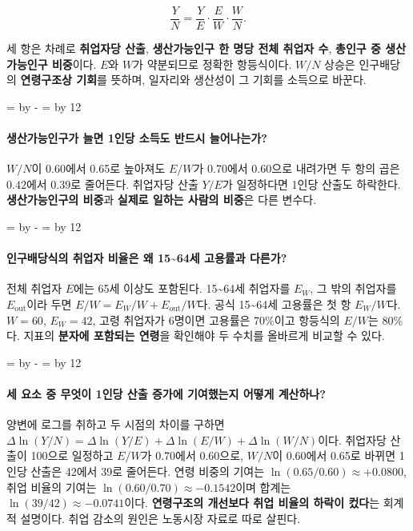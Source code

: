 \documentclass[10pt,a4paper]{article}
\newcommand{\ReserveQuestionSpace}{%
  \par\begingroup
  \dimen0=\pagegoal \advance\dimen0 by -\pagetotal
  \dimen2=\baselineskip \multiply\dimen2 by 12
  \ifdim\dimen0<\dimen2 \newpage\fi
  \endgroup}
\begin{document}
\[
\frac{Y}{N}=\frac{Y}{E}\cdot\frac{E}{W}\cdot\frac{W}{N}.
\]

세 항은 차례로 \textbf{취업자당 산출}, \textbf{생산가능인구 한 명당 전체 취업자 수}, \textbf{총인구 중 생산가능인구 비중}이다. $E$와 $W$가 약분되므로 정확한 항등식이다. $W/N$ 상승은 인구배당의 \textbf{연령구조상 기회}를 뜻하며, 일자리와 생산성이 그 기회를 소득으로 바꾼다.\par

\ReserveQuestionSpace
\paragraph{생산가능인구가 늘면 1인당 소득도 반드시 늘어나는가?}
$W/N$이 0.60에서 0.65로 높아져도 $E/W$가 0.70에서 0.60으로 내려가면 두 항의 곱은 $0.42$에서 $0.39$로 줄어든다. 취업자당 산출 $Y/E$가 일정하다면 1인당 산출도 하락한다. \textbf{생산가능인구의 비중}과 \textbf{실제로 일하는 사람의 비중}은 다른 변수다.\par

\ReserveQuestionSpace
\paragraph{인구배당식의 취업자 비율은 왜 15\textasciitilde{}64세 고용률과 다른가?}
전체 취업자 $E$에는 65세 이상도 포함된다. 15\textasciitilde{}64세 취업자를 $E_W$, 그 밖의 취업자를 $E_{\mathrm{out}}$이라 두면 $E/W=E_W/W+E_{\mathrm{out}}/W$다. 공식 15\textasciitilde{}64세 고용률은 첫 항 $E_W/W$다. $W=60$, $E_W=42$, 고령 취업자가 6명이면 고용률은 70\%이고 항등식의 $E/W$는 80\%다. 지표의 \textbf{분자에 포함되는 연령}을 확인해야 두 수치를 올바르게 비교할 수 있다.\par

\ReserveQuestionSpace
\paragraph{세 요소 중 무엇이 1인당 산출 증가에 기여했는지 어떻게 계산하나?}
양변에 로그를 취하고 두 시점의 차이를 구하면 $\Delta\ln(Y/N)=\Delta\ln(Y/E)+\Delta\ln(E/W)+\Delta\ln(W/N)$이다. 취업자당 산출이 100으로 일정하고 $E/W$가 0.70에서 0.60으로, $W/N$이 0.60에서 0.65로 바뀌면 1인당 산출은 42에서 39로 줄어든다. 연령 비중의 기여는 $\ln(0.65/0.60)\approx+0.0800$, 취업 비율의 기여는 $\ln(0.60/0.70)\approx-0.1542$이며 합계는 $\ln(39/42)\approx-0.0741$이다. \textbf{연령구조의 개선보다 취업 비율의 하락이 컸다}는 회계적 설명이다. 취업 감소의 원인은 노동시장 자료로 따로 살핀다.\par
\end{document}
